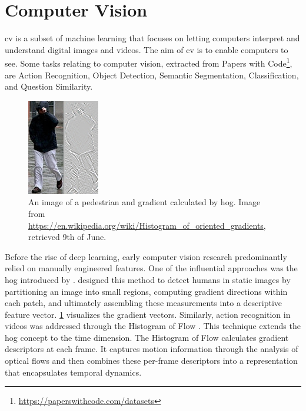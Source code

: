 \section{Computer Vision} 
\label{sec:computer_vision}

\acrfull{cv} is a subset of machine learning that focuses on letting computers interpret and understand digital images and videos. The aim of \acrlong{cv} is to enable computers to see. Some tasks relating to computer vision, extracted from Papers with Code\footnote{\url{https://paperswithcode.com/datasets}}, are Action Recognition, Object Detection, Semantic Segmentation, Classification, and Question Similarity.

\begin{figure}
    \centering
    \includegraphics[width=0.5\linewidth]{figures/Pedestrian_gradient.jpg}
    \caption{An image of a pedestrian and gradient calculated by \acrshort{hog}. Image from \url{https://en.wikipedia.org/wiki/Histogram_of_oriented_gradients}, retrieved 9th of June.}
    \label{fig:pedestrian_gradient}
\end{figure}

Before the rise of deep learning, early computer vision research predominantly relied on manually engineered features. One of the influential approaches was the \acrfull{hog} introduced by \textcite{dalal_histogram_of_gradients}. \textcite{dalal_histogram_of_gradients} designed this method to detect humans in static images by partitioning an image into small regions, computing gradient directions within each patch, and ultimately assembling these measurements into a descriptive feature vector. \cref{fig:pedestrian_gradient} visualizes the gradient vectors. Similarly, action recognition in videos was addressed through the Histogram of Flow \cite{dalal_histogram_of_flow}. This technique extends the \acrshort{hog} concept to the time dimension. The Histogram of Flow calculates gradient descriptors at each frame. It captures motion information through the analysis of optical flows and then combines these per-frame descriptors into a representation that encapsulates temporal dynamics. 

